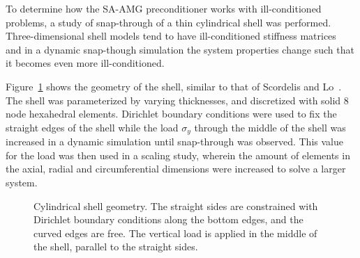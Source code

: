 To determine how the SA-AMG preconditioner works with ill-conditioned problems, a study of snap-through of a thin cylindrical shell was performed. Three-dimensional shell models tend to have ill-conditioned stiffness matrices~\cite{Wall2000} and in a dynamic snap-though simulation the system properties change such that it becomes even more ill-conditioned.

Figure~\ref{fig:shell} shows the geometry of the shell, similar to that of Scordelis and Lo~\cite{Scordelis1969}. The shell was parameterized by varying thicknesses, and discretized with solid 8 node hexahedral elements. Dirichlet boundary conditions were used to fix the straight edges of the shell while the load $\sigma_y$ through the middle of the shell was increased in a dynamic simulation until snap-through was observed. This value for the load was then used in a scaling study, wherein the amount of elements in the axial, radial and circumferential dimensions were increased to solve a larger system.

\begin{figure}[ht]
  \centering
\caption{Cylindrical shell geometry. The straight sides are constrained with Dirichlet boundary conditions along the bottom edges, and the curved edges are free. The vertical load is applied in the middle of the shell, parallel to the straight sides.}
\label{fig:shell}
\end{figure}

